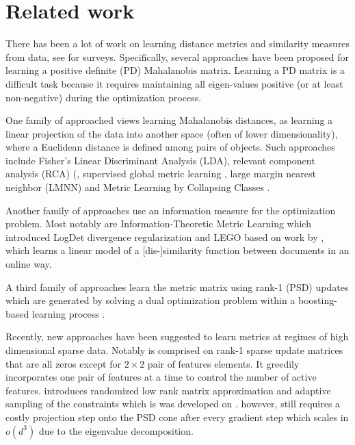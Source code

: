 \documentclass{article}
\begin{document}
\section{Related work}
There has been a lot of work on learning distance metrics and similarity measures from data, see \cite{bellet2013survey, kulis2012survey, yang2006survey} for surveys. Specifically, several approaches have been proposed for learning a positive definite (PD) Mahalanobis matrix. Learning a PD matrix is a difficult task because it requires maintaining all eigen-values positive (or at least non-negative) during the optimization process. 

One family of approached views learning Mahalanobis distances, as learning a linear projection of the data into another space (often of lower dimensionality), where a Euclidean distance is
defined among pairs of objects. Such approaches include Fisher’s Linear Discriminant Analysis
(LDA), relevant component analysis (RCA) (, supervised global
metric learning , large margin nearest neighbor (LMNN)  and Metric Learning by Collapsing Classes .

Another family of approaches use an information measure for the optimization problem. Most notably are Information-Theoretic Metric Learning  which introduced LogDet divergence regularization and LEGO \cite{lego} based on work by , which learns a linear model of a [dis-]similarity function between documents in an online way.

A third family of approaches \cite{boost}  learn the metric matrix using rank-1 (PSD) updates which are generated by solving a dual optimization problem within a boosting-based learning process .


Recently, new approaches have been suggested to learn metrics at regimes of high dimensional sparse data. Notably \cite{hdsl} is comprised on rank-1 sparse update matrices that are all zeros except for $2\times2$ pair of features elements. It greedily incorporates one pair of features at a time to control the number of active features. \cite{qian2014} introduces randomized low rank matrix approximation and adaptive sampling of the constraints which is was developed on \cite{qian}. \cite{qian} however, still requires a costly projection step onto the PSD cone after every gradient step which scales in $o(d^3)$ due to the eigenvalue decomposition.
\end{document}
